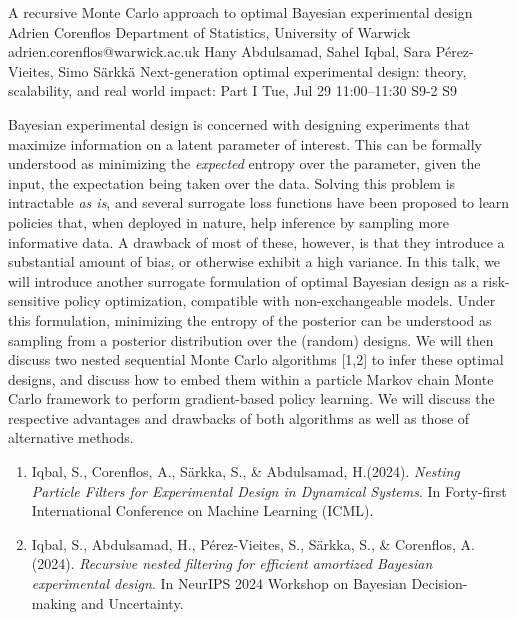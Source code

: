 \documentclass[12pt,lettersize,oneside]{book} %
\begin{document}
\begin{talk}
  {A recursive Monte Carlo approach to optimal Bayesian experimental design}%
  {Adrien Corenflos}%
  {Department of Statistics, University of Warwick}%
  {adrien.corenflos@warwick.ac.uk}%
  {Hany Abdulsamad, Sahel Iqbal, Sara P\'erez-Vieites, Simo S\"arkk\"a}%
  {Next-generation optimal experimental design: theory, scalability, and real world impact: Part I}%
  {Tue, Jul 29 11:00--11:30}%
  {S9-2}%
  {S9}%
    
   
    Bayesian experimental design is concerned with designing experiments that maximize information on a latent parameter of interest. 
    This can be formally understood as minimizing the \emph{expected} entropy over the parameter, given the input, the expectation being taken over the data.
    Solving this problem is intractable \emph{as is}, and several surrogate loss functions have been proposed to learn policies that, when deployed in nature, help inference by sampling more informative data.
    A drawback of most of these, however, is that they introduce a substantial amount of bias, or otherwise exhibit a high variance.
    In this talk, we will introduce another surrogate formulation of optimal Bayesian design as a risk-sensitive policy optimization, compatible with non-exchangeable models.
    Under this formulation, minimizing the entropy of the posterior can be understood as sampling from a posterior distribution over the (random) designs.
    We will then discuss two nested sequential Monte Carlo algorithms [1,2] to infer these optimal designs, and discuss how to embed them within a particle Markov chain Monte Carlo framework to perform gradient-based policy learning. 
    We will discuss the respective advantages and drawbacks of both algorithms as well as those of alternative methods.
\medskip


\begin{enumerate}
 \item[{[1]}]Iqbal, S., Corenflos, A., S\"arkka, S., \&  Abdulsamad, H.(2024). {\it Nesting Particle Filters for Experimental Design in Dynamical Systems}. In Forty-first International Conference on Machine Learning (ICML).
 \item[{[2]}] Iqbal, S., Abdulsamad, H., P\'erez-Vieites, S., S\"arkka, S., \& Corenflos, A. (2024). {\it Recursive nested filtering for efficient amortized Bayesian experimental design}. In NeurIPS 2024 Workshop on Bayesian Decision-making and Uncertainty.
\end{enumerate}

\end{talk}
\end{document}
